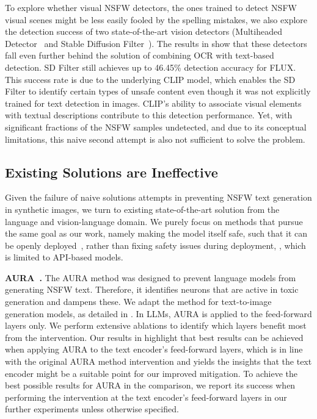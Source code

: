 To explore whether visual NSFW detectors, \ie the ones trained to detect NSFW visual scenes might be less easily fooled by the spelling mistakes, we also explore the detection success of two state-of-the-art vision detectors (Multiheaded Detector~\citep{qu2023unsafe} and Stable Diffusion Filter~\citep{rando2022red}).
The results in  show that these detectors fall even further behind the solution of combining OCR with text-based detection. SD Filter still achieves up to 46.45\% detection accuracy for FLUX. This success rate is due to the underlying CLIP model, which enables the SD Filter to identify certain types of unsafe content even though it was not explicitly trained for text detection in images. CLIP’s ability to associate visual elements with textual descriptions contribute to this detection performance.
Yet, with significant fractions of the NSFW samples undetected, and due to its conceptual limitations, this naive second attempt is also not sufficient to solve the problem.

\subsection{Existing Solutions are Ineffective}
\label{sub:existing_solutions}

Given the failure of naive solutions attempts in preventing NSFW text generation in synthetic images, we turn to existing state-of-the-art solution from the language and vision-language domain.
We purely focus on methods that pursue the same goal as our work, namely making the model itself safe, such that it can be openly deployed~\citep{suau2024whispering,gandikota2023erasing,poppi2025safe}, rather than fixing safety issues during deployment, \eg \citep{schramowski2023safe}, which is limited to API-based models.

\textbf{AURA~\citep{suau2024whispering}.} The AURA method was designed to prevent language models from generating NSFW text. Therefore, it identifies neurons that are active in toxic generation and dampens these.
We adapt the method for text-to-image generation models, as detailed in . In LLMs, AURA is applied to the feed-forward layers only. We perform extensive ablations to identify which layers benefit most from the intervention. Our results in  highlight that best results can be achieved when applying AURA to the text encoder's feed-forward layers, which is in line with the original AURA method intervention and yields the insights that the text encoder might be a suitable point for our improved mitigation. 
To achieve the best possible results for AURA in the comparison, we report its success when performing the intervention at the text encoder's feed-forward layers in our further experiments unless otherwise specified.

